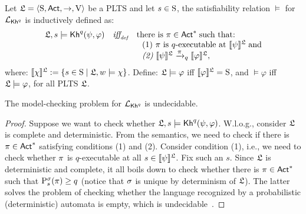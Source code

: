 \begin{definition}
    Let $\model = \tup{\S,\ACT,\ra,\V}$ be a PLTS and let $s\in\S$, the satisfiability relation $\models$ for $\PKh$ is inductively defined as:
    \[
        \begin{array}{l@{\ \ \ }c@{\ \ \  }l}
        \model, s \models \kh^q(\psi,\varphi) & \iffdef & \text{there is } \plan \in \ACT^* \;\text{such that:} \\
        & & \ \ \text{\rm (1)} \ \plan \text{ is $q$-executable at }  \truthset{\model}{\psi}\; \text{and} \\
        & & \ \ \text{\em (2)} \ \truthset{\model}{\psi} \reach{\plan}_q \truthset{\model}{\varphi}, 
        \end{array}
        \] 
        where: $\truthset{\model}{\chi} := \csetsc{s\in\S}{\model,w\models\chi}$. Define: $\model\models\varphi$ iff  $\truthset{\model}{\varphi}=\S$, and $\models\varphi$ iff $\model\models\varphi$, for all PLTS $\model$.
\end{definition}

\begin{theorem}\label{th:mc-khp-undecidable}
The model-checking problem for $\PKh$ is undecidable.
\end{theorem}

\begin{proof}
    Suppose we want to check whether $\model,s\models\kh^q(\psi,\varphi)$.  W.l.o.g., consider $\model$ is complete and deterministic. 
    From the semantics, we need to check if there is $\plan\in\ACT^*$ satisfying conditions (1) and (2). Consider condition (1), i.e., we need to check whether $\plan$ is $q$-executable at all $s\in\truthset{\model}{\psi}$. Fix such an $s$. Since $\model$ is deterministic and complete, it all boils down to check whether there is $\plan\in\ACT^*$ such that $\probability^\strategy_s(\plan)\geq q$ (notice that $\strategy$ is unique by determinism of $\model$). 
    The latter solves the problem of checking whether the language recognized by a probabilistic (deterministic) automata is empty, which is undecidable~\cite{MadaniHC99}. 
\end{proof}
